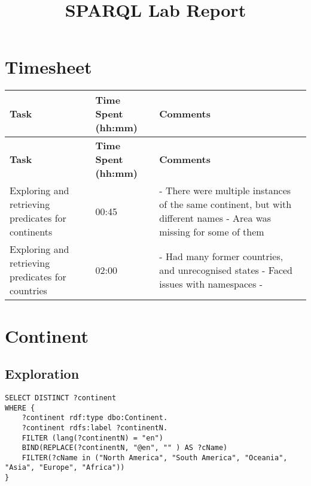 \documentclass[11pt]{article}
\begin{document}
\title{\LARGE{\textbf{SPARQL Lab Report}}\vspace{-2em}}
\date{}
\maketitle



\setlength{\parindent}{0pt}

\section*{Timesheet}

\begin{longtable}{|p{4cm}|p{4.5cm}|p{6cm}|}
    \hline
    \textbf{Task} & \textbf{Time Spent (hh:mm)} & \textbf{Comments} \\ 
    \hline
    \endfirsthead
    
    \hline
    \textbf{Task} & \textbf{Time Spent (hh:mm)} & \textbf{Comments} \\ 
    \hline
    \endhead

    Exploring and retrieving predicates for continents & 00:45 & 
        - There were multiple instances of the same continent, but with different names \newline
        - Area was missing for some of them
    \\
    \hline

    Exploring and retrieving predicates for countries & 02:00 & 
        - Had many former countries, and unrecognised states \newline
        - Faced issues with namespaces
        - 
    \\
    \hline
\end{longtable}

\section{Continent}

\subsection{Exploration}

{\footnotesize\begin{verbatim}
SELECT DISTINCT ?continent
WHERE {
    ?continent rdf:type dbo:Continent.
    ?continent rdfs:label ?continentN.
    FILTER (lang(?continentN) = "en")
    BIND(REPLACE(?continentN, "@en", "" ) AS ?cName)
    FILTER(?cName in ("North America", "South America", "Oceania", "Asia", "Europe", "Africa"))
}
\end{verbatim}}
\end{document}
